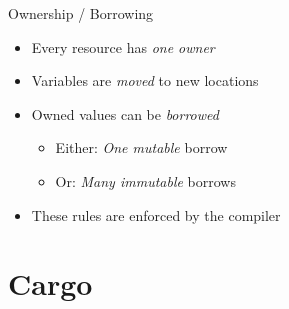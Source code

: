 \documentclass[aspectratio=1610,t]{beamer}
\begin{document}
\begin{frame}[c]{Ownership / Borrowing}
  \begin{itemize}
    \item Every resource has \emph{one owner}
    \item Variables are \emph{moved} to new locations
    \item Owned values can be \emph{borrowed}
      \begin{itemize}
        \item{Either: \emph{One mutable} borrow}
        \item{Or: \emph{Many immutable} borrows}
      \end{itemize}
    \item These rules are enforced by the compiler
  \end{itemize}
\end{frame}

\section{Cargo}
\end{document}
